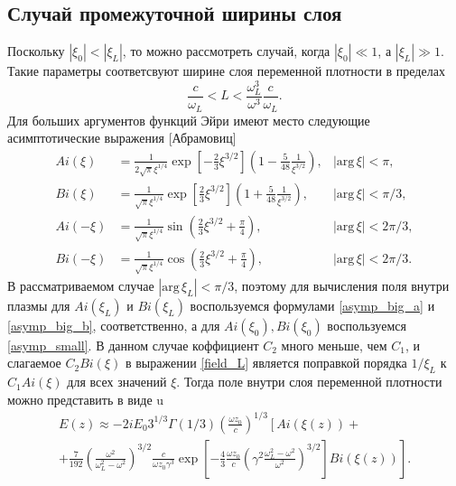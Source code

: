 \documentclass[12pt,a4paper]{article}
\numberwithin{equation}{section}
\begin{document}
\subsection{Случай промежуточной ширины слоя}
Поскольку $|\xi_0|<|\xi_L|$, то можно рассмотреть случай, когда $|\xi_0|\ll 1$, а $|\xi_L| \gg 1$. Такие параметры соответсвуют ширине слоя переменной плотности в пределах 
\begin{equation}
    \label{cond2}
    \frac{c}{\omega_L}<L<\frac{\omega_L^3}{\omega^3} \frac{c}{\omega_L}.
\end{equation}
Для больших аргументов функций Эйри имеют место следующие асимптотические выражения [Абрамовиц]
\begin{subequations}
\label{asymp_big}
\begin{align}
    Ai\left(\xi\right) &= \frac{1}{2\sqrt{\pi}\xi^{1/4}}\exp\left[-\frac{2}{3}\xi^{3/2}\right]\left(1-\frac{5}{48}\frac{1}{\xi^{3/2}}\right),& |\text{arg}\,\xi| <\pi, \label{asymp_big_a}
    \\ Bi\left(\xi\right) &= \frac{1}{\sqrt{\pi}\xi^{1/4}}\exp\left[\frac{2}{3}\xi^{3/2}\right]\left(1+\frac{5}{48}\frac{1}{\xi^{3/2}}\right),& |\text{arg}\, \xi| <\pi/3, \label{asymp_big_b}\\ 
    Ai\left(-\xi\right) &= \frac{1}{\sqrt{\pi}\xi^{1/4}}\sin\left(\frac{2}{3}\xi^{3/2}+\frac{\pi}{4}\right),& |\text{arg}\, \xi| <2\pi/3, \label{asymp_big_c} \\
    Bi\left(-\xi\right) &= \frac{1}{\sqrt{\pi}\xi^{1/4}}\cos\left(\frac{2}{3}\xi^{3/2}+\frac{\pi}{4}\right),& |\text{arg}\,\xi| <2\pi/3. \label{asymp_big_d}
\end{align}
\end{subequations}
В рассматриваемом случае $|\text{arg}\, \xi_L| <\pi/3$, поэтому для вычисления поля внутри плазмы для $Ai\left(\xi_L\right)$ и $Bi\left(\xi_L\right)$ воспользуемся формулами \eqref{asymp_big_a} и \eqref{asymp_big_b}, соответственно, а для $Ai\left(\xi_0\right), Bi\left(\xi_0\right)$ воспользуемся \eqref{asymp_small}. В данном случае коффициент $C_2$ много меньше, чем $C_1$, и слагаемое $C_2Bi\left(\xi\right)$ в выражении \eqref{field_L} является поправкой порядка $1/\xi_L$ к $C_1Ai\left(\xi\right)$ для всех значений $\xi$. Тогда поле внутри слоя переменной плотности можно представить в виде
u\begin{eqnarray}
    E\left(z\right)\approx -2i E_0 3^{1/3} \Gamma\left(1/3\right)\left(\frac{\omega z_0}{c}\right)^{1/3}\left[ Ai\left(\xi\left(z\right)\right)+ \nonumber\right. \\
    +\left.\frac{7}{192}\left(\frac{\omega^2}{\omega_L^2-\omega^2}\right)^{3/2}\frac{c}{\omega z_0 \gamma^3}\exp\left[-\frac{4}{3}\frac{\omega z_0}{c}\left(\gamma^2\frac{\omega_L^2-\omega^2}{\omega^2}\right)^{3/2}\right]Bi\left(\xi\left(z\right)\right)\right]. 
    \label{E1_med}
\end{eqnarray}
\end{document}
